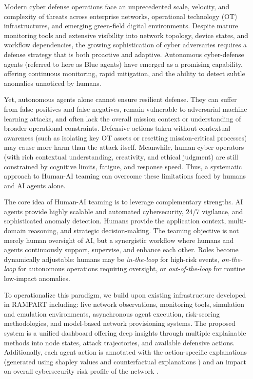Modern cyber defense operations face an unprecedented scale, velocity, and complexity of threats across enterprise networks, operational technology (OT) infrastructures, and emerging green-field digital environments. 
Despite mature monitoring tools and extensive visibility into network topology, device states, and workflow dependencies, the growing sophistication of cyber adversaries requires a defense strategy that is both proactive and adaptive.
Autonomous cyber-defense agents (referred to here as Blue agents) have emerged as a promising capability, offering continuous monitoring, rapid mitigation, and the ability to detect subtle anomalies unnoticed by humans.

Yet, autonomous agents alone cannot ensure resilient defense. 
They can suffer from false positives and false negatives, remain vulnerable to adversarial machine-learning attacks, and often lack the overall mission context or understanding of broader operational constraints. 
Defensive actions taken without contextual awareness (such as isolating key OT assets or resetting mission-critical processes) may cause more harm than the attack itself.
Meanwhile, human cyber operators (with rich contextual understanding, creativity, and ethical judgment) are still constrained by cognitive limits, fatigue, and response speed. Thus, a systematic approach to Human-AI teaming can overcome these limitations faced by humans and AI agents alone.

The core idea of Human-AI teaming is to leverage complementary strengths.
AI agents provide highly scalable and automated cybersecurity, 24/7 vigilance, and sophisticated anomaly detection. Humans provide the application context, multi-domain reasoning, and strategic decision-making. 
The teaming objective is not merely human oversight of AI, but a synergistic workflow where humans and agents continuously support, supervise, and enhance each other. 
Roles become dynamically adjustable: humans may be \textit{in-the-loop} for high-risk events, \textit{on-the-loop} for autonomous operations requiring oversight, or \textit{out-of-the-loop} for routine low-impact anomalies.

To operationalize this paradigm, we build upon existing infrastructure developed in RAMPART \cite{neema2024rampart} including: live network observations, monitoring tools, simulation and emulation environments, asynchronous agent execution, risk-scoring methodologies, and model-based network provisioning systems.
The proposed system is a unified dashboard offering deep insights through multiple explainable methods into node states, attack trajectories, and available defensive actions.
Additionally, each agent action is annotated with the action-specific explanations (generated
using shapley values \cite{b3} and counterfactual explanations \cite{b4}) and
an impact on overall cybersecurity risk profile of the network \cite{neema2021model}.

